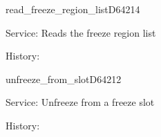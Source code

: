 \begin{hyppotrap}{read\_freeze\_region\_list}{D642}{14}
\item [Service:]
  Reads the freeze region list
\item [History:]
\end{hyppotrap}


\begin{hyppotrap}{unfreeze\_from\_slot}{D642}{12}
\item [Service:]
  Unfreeze from a freeze slot
\item [History:]
\end{hyppotrap}
